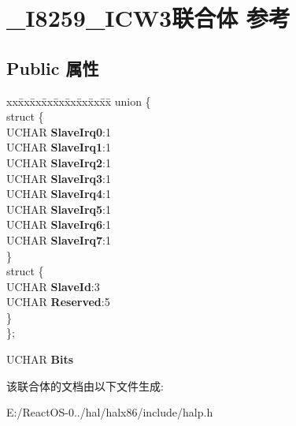 \hypertarget{union___i8259___i_c_w3}{}\section{\+\_\+\+I8259\+\_\+\+I\+C\+W3联合体 参考}
\label{union___i8259___i_c_w3}
\subsection*{Public 属性}
\begin{DoxyCompactItemize}
\item 
\mbox{\label{union___i8259___i_c_w3_a0a71e3c1b8803ad78108c733ffb59e77}} 
\begin{tabbing}
xx\=xx\=xx\=xx\=xx\=xx\=xx\=xx\=xx\=\kill
union \{\\
\mbox{\label{union___i8259___i_c_w3_1_1_0D1324_a1803c942b1ddc8b4ae6808b84ef706ab}} 
\>struct \{\\
\>\>UCHAR {\bfseries SlaveIrq0}:1\\
\>\>UCHAR {\bfseries SlaveIrq1}:1\\
\>\>UCHAR {\bfseries SlaveIrq2}:1\\
\>\>UCHAR {\bfseries SlaveIrq3}:1\\
\>\>UCHAR {\bfseries SlaveIrq4}:1\\
\>\>UCHAR {\bfseries SlaveIrq5}:1\\
\>\>UCHAR {\bfseries SlaveIrq6}:1\\
\>\>UCHAR {\bfseries SlaveIrq7}:1\\
\>\} \\
\mbox{\label{union___i8259___i_c_w3_1_1_0D1324_a77899136da16193c2b220c612bf4dbd5}} 
\>struct \{\\
\>\>UCHAR {\bfseries SlaveId}:3\\
\>\>UCHAR {\bfseries Reserved}:5\\
\>\} \\
\}; \\

\end{tabbing}\item 
\mbox{\label{union___i8259___i_c_w3_aa8b9747d7d8e51276e225b263f6bc158}} 
U\+C\+H\+AR {\bfseries Bits}
\end{DoxyCompactItemize}


该联合体的文档由以下文件生成\+:\begin{DoxyCompactItemize}
\item 
E\+:/\+React\+O\+S-\/0../hal/halx86/include/halp.\+h\end{DoxyCompactItemize}
